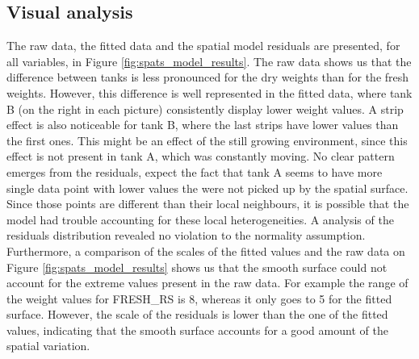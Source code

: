 \subsection{Visual analysis}
The raw data, the fitted data and the spatial model residuals are presented, for all variables, in Figure \ref{fig:spats_model_results}. The raw data shows us that the difference between tanks is less pronounced for the dry weights than for the fresh weights. However, this difference is well represented in the fitted data, where tank B (on the right in each picture) consistently display lower weight values. A strip effect is also noticeable for tank B, where the last strips have lower values than the first ones. This might be an effect of the still growing environment, since this effect is not present in tank A, which was constantly moving. No clear pattern emerges from the residuals, expect the fact that tank A seems to have more single data point with lower values the were not picked up by the spatial surface. Since those points are different than their local neighbours, it is possible that the model had trouble accounting for these local heterogeneities. A analysis of the residuals distribution revealed no violation to the normality assumption.\\

Furthermore, a comparison of the scales of the fitted values and the raw data on Figure \ref{fig:spats_model_results} shows us that the smooth surface could not account for the extreme values present in the raw data. For example the range of the weight values for FRESH\_RS is 8, whereas it only goes to 5 for the fitted surface. However, the scale of the residuals is lower than the one of the fitted values, indicating that the smooth surface accounts for a good amount of the spatial variation.

